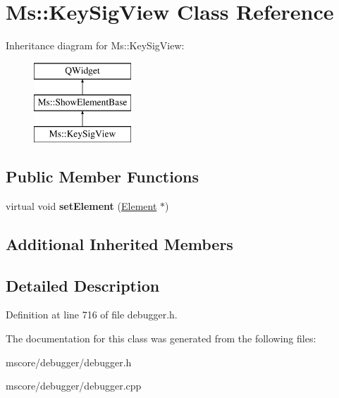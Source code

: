 \hypertarget{class_ms_1_1_key_sig_view}{}\section{Ms\+:\+:Key\+Sig\+View Class Reference}
\label{class_ms_1_1_key_sig_view}
Inheritance diagram for Ms\+:\+:Key\+Sig\+View\+:\begin{figure}[H]
\begin{center}
\leavevmode
\includegraphics[height=3.000000cm]{class_ms_1_1_key_sig_view}
\end{center}
\end{figure}
\subsection*{Public Member Functions}
\begin{DoxyCompactItemize}
\item 
\mbox{\label{class_ms_1_1_key_sig_view_a70d7cb49b3d6546d5d3a3ce5666bdb0a}} 
virtual void {\bfseries set\+Element} (\hyperlink{class_ms_1_1_element}{Element} $\ast$)
\end{DoxyCompactItemize}
\subsection*{Additional Inherited Members}


\subsection{Detailed Description}


Definition at line 716 of file debugger.\+h.



The documentation for this class was generated from the following files\+:\begin{DoxyCompactItemize}
\item 
mscore/debugger/debugger.\+h\item 
mscore/debugger/debugger.\+cpp\end{DoxyCompactItemize}
